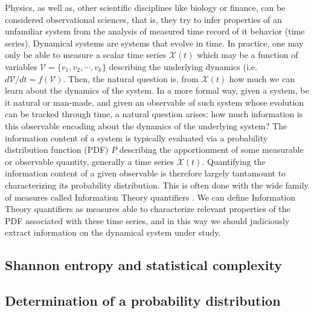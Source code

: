 Physics, as well as, other scientific disciplines like biology or finance, can be considered observational sciences, 
that is, they try to infer  properties of an unfamiliar system from  the analysis of measured time
record of it behavior (time series).  
Dynamical systems are systems that evolve in time.
In practice, one may only be able to measure a scalar time series ${\mathcal X}(t)$ which may be a function of
variables ${\mathcal V}=\{ v_1,  v_2,\cdots, v_k\}$ describing the underlying dynamics 
(i.e. $d{\mathcal V}/dt=f({\mathcal V})$.
Then, the natural question is, from ${\mathcal X}(t)$ how much  we can learn about the dynamics of the system.
In a  more formal way,
given a system, be it natural or man-made, and given an observable of such system whose evolution can be tracked 
through time, a natural question arises: how much information is this observable encoding about the dynamics of 
the underlying system? 
The information content of a system is typically evaluated via a probability distribution function (PDF) $P$ 
describing the apportionment of some measurable or observable quantity, generally a time series ${\mathcal X}(t)$. 
Quantifying the information content of a given observable is therefore largely tantamount to characterizing its 
probability distribution. 
This is often done with the wide family of measures called Information Theory quantifiers \cite{Gray1990}.
We can define Information Theory quantifiers as measures able to characterize relevant properties of the 
PDF associated with these time series, and in this way we should judiciously extract information on the dynamical 
system under study.

\subsection{Shannon entropy and statistical complexity}



\subsection{Determination of a probability distribution}


